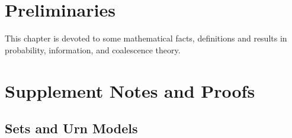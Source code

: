 \documentclass[12pt, a4paper,twoside]{report}
\theoremstyle{definition}
\theoremstyle{myplain}
\theoremstyle{mypro}
\begin{document}
\chapter{Preliminaries}
This chapter is devoted to some mathematical facts, definitions and results in probability, information, and coalescence theory.



\appendix
\chapter{Supplement Notes and Proofs}
\section{Sets and Urn Models}
\end{document}
